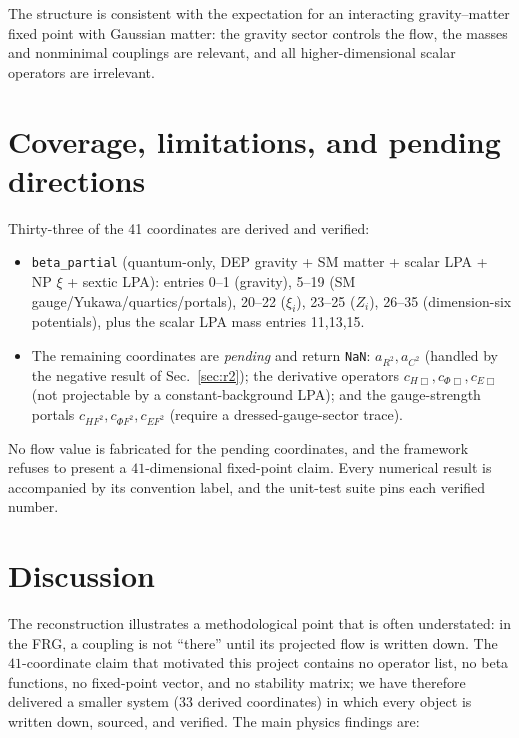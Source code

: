\documentclass[11pt]{article}
\begin{document}
The structure is consistent with the expectation for an interacting
gravity--matter fixed point with Gaussian matter: the gravity sector
controls the flow, the masses and nonminimal couplings are relevant, and all
higher-dimensional scalar operators are irrelevant.

\section{Coverage, limitations, and pending directions}
\label{sec:coverage}

Thirty-three of the 41 coordinates are derived and verified:
\begin{itemize}
  \item \texttt{beta\_partial} (quantum-only, DEP gravity + SM matter +
        scalar LPA + NP $\xi$ + sextic LPA): entries 0--1 (gravity),
        5--19 (SM gauge/Yukawa/quartics/portals), 20--22 ($\xi_i$),
        23--25 ($Z_i$), 26--35 (dimension-six potentials), plus the scalar
        LPA mass entries 11,13,15.
  \item The remaining coordinates are \emph{pending} and return \texttt{NaN}:
        $a_{R^2},a_{C^2}$ (handled by the negative result of
        Sec.~\ref{sec:r2}); the derivative operators $c_{H\Box},c_{\Phi\Box},
        c_{E\Box}$ (not projectable by a constant-background LPA); and the
        gauge-strength portals $c_{HF^2},c_{\Phi F^2},c_{EF^2}$ (require a
        dressed-gauge-sector trace).
\end{itemize}
No flow value is fabricated for the pending coordinates, and the framework
refuses to present a $41$-dimensional fixed-point claim.  Every numerical
result is accompanied by its convention label, and the unit-test suite pins
each verified number.

\section{Discussion}
\label{sec:discussion}

The reconstruction illustrates a methodological point that is often
understated: in the FRG, a coupling is not ``there'' until its projected
flow is written down.  The $41$-coordinate claim that motivated this project
contains no operator list, no beta functions, no fixed-point vector, and no
stability matrix; we have therefore delivered a smaller system (33 derived
coordinates) in which every object is written down, sourced, and verified.
The main physics findings are:
\end{document}

